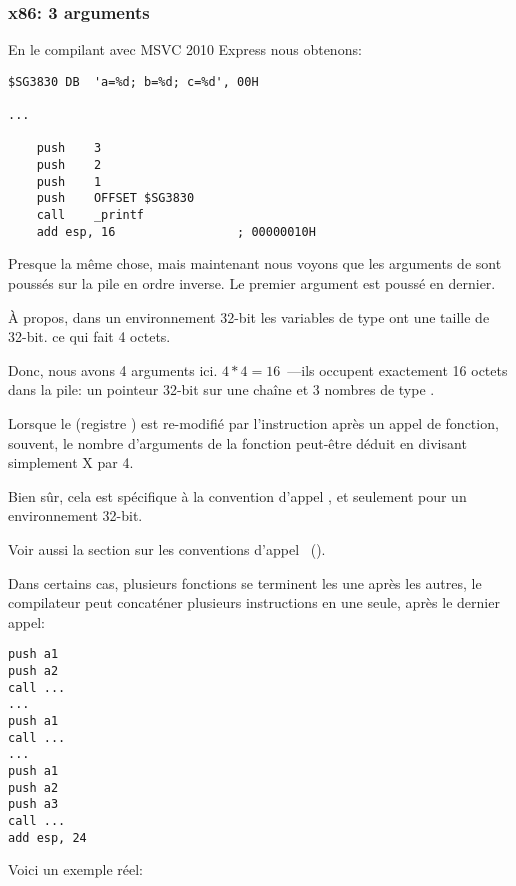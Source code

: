\subsubsection{x86: 3 arguments}


En le compilant avec MSVC 2010 Express nous obtenons:

\begin{lstlisting}[style=customasmx86]
$SG3830	DB	'a=%d; b=%d; c=%d', 00H

...

	push	3
	push	2
	push	1
	push	OFFSET $SG3830
	call	_printf
	add	esp, 16					; 00000010H
\end{lstlisting}

Presque la même chose, mais maintenant nous voyons que les arguments de \printf sont
poussés sur la pile en ordre inverse. Le premier argument est poussé en dernier.

À propos, dans un environnement 32-bit les variables de type \Tint ont une taille
de 32-bit. ce qui fait 4 octets.

Donc, nous avons 4 arguments ici. $4*4 = 16$~---ils occupent exactement 16 octets
dans la pile: un pointeur 32-bit sur une chaîne et 3 nombres de type \Tint.

Lorsque le  (registre \ESP) est re-modifié
par l'instruction  après un appel de fonction, souvent, le nombre
d'arguments de la fonction peut-être déduit en divisant simplement X par 4.

Bien sûr, cela est spécifique à la convention d'appel , et seulement
pour un environnement 32-bit.

Voir aussi la section sur les conventions d'appel ~().

Dans certains cas, plusieurs fonctions se terminent les une après les autres, le
compilateur peut concaténer plusieurs instructions  en une seule,
après le dernier appel:

\begin{lstlisting}[style=customasmx86]
push a1
push a2
call ...
...
push a1
call ...
...
push a1
push a2
push a3
call ...
add esp, 24
\end{lstlisting}

Voici un exemple réel:



